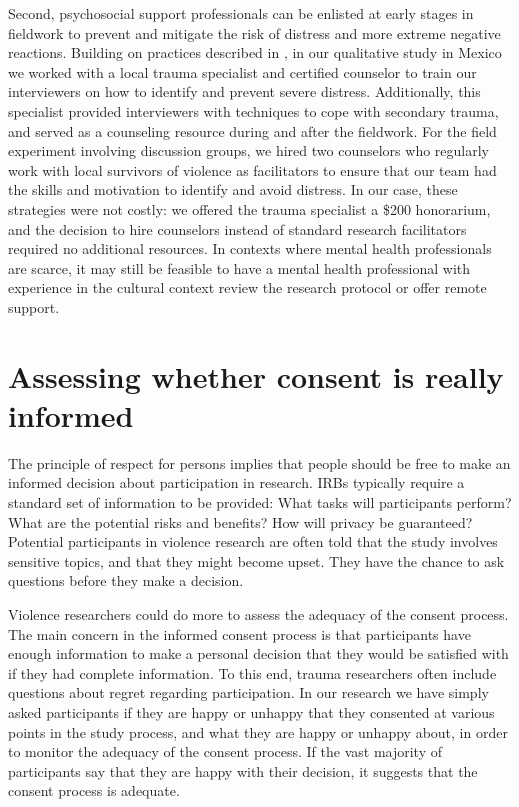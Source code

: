 Second, psychosocial support professionals can be enlisted at early stages in fieldwork to prevent and mitigate the risk of distress and more extreme negative reactions. Building on practices described in \citet{paluck2009deference}, in our qualitative study in Mexico we worked with a local trauma specialist and certified counselor to train our interviewers on how to identify and prevent severe distress. Additionally, this specialist provided interviewers with techniques to cope with secondary trauma, and served as a counseling resource during and after the fieldwork. For the field experiment involving discussion groups, we hired two counselors who regularly work with local survivors of violence as facilitators to ensure that our team had the skills and motivation to identify and avoid distress. In our case, these strategies were not costly: we offered the trauma specialist a \$200 honorarium, and the decision to hire counselors instead of standard research facilitators required no additional resources. In contexts where mental health professionals are scarce, it may still be feasible to have a mental health professional with experience in the cultural context review the research protocol or offer remote support. 



\section{Assessing whether consent is really informed}

The principle of respect for persons implies that people should be free to make an informed decision about participation in research. IRBs typically require a standard set of information to be provided: What tasks will participants perform? What are the potential risks and benefits? How will privacy be guaranteed? Potential participants in violence research are often told that the study involves sensitive topics, and that they might become upset. They have the chance to ask questions before they make a decision.  

Violence researchers could do more to assess the adequacy of the consent process. The main concern in the informed consent process is that participants have enough information to make a personal decision that they would be satisfied with if they had complete information. To this end, trauma researchers often include questions about regret regarding participation. In our research we have simply asked participants if they are happy or unhappy that they consented at various points in the study process, and what they are happy or unhappy about, in order to monitor the adequacy of the consent process. If the vast majority of participants say that they are happy with their decision, it suggests that the consent process is adequate.  

